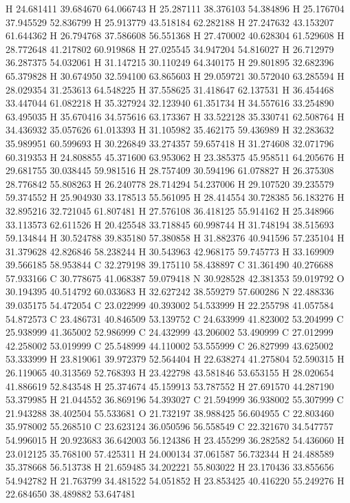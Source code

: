 \documentclass{article}
\begin{document}
H 24.681411 39.684670 64.066743
H 25.287111 38.376103 54.384896
H 25.176704 37.945529 52.836799
H 25.913779 43.518184 62.282188
H 27.247632 43.153207 61.644362
H 26.794768 37.586608 56.551368
H 27.470002 40.628304 61.529608
H 28.772648 41.217802 60.919868
H 27.025545 34.947204 54.816027
H 26.712979 36.287375 54.032061
H 31.147215 30.110249 64.340175
H 29.801895 32.682396 65.379828
H 30.674950 32.594100 63.865603
H 29.059721 30.572040 63.285594
H 28.029354 31.253613 64.548225
H 37.558625 31.418647 62.137531
H 36.454468 33.447044 61.082218
H 35.327924 32.123940 61.351734
H 34.557616 33.254890 63.495035
H 35.670416 34.575616 63.173367
H 33.522128 35.330741 62.508764
H 34.436932 35.057626 61.013393
H 31.105982 35.462175 59.436989
H 32.283632 35.989951 60.599693
H 30.226849 33.274357 59.657418
H 31.274608 32.071796 60.319353
H 24.808855 45.371600 63.953062
H 23.385375 45.958511 64.205676
H 29.681755 30.038445 59.981516
H 28.757409 30.594196 61.078827
H 26.375308 28.776842 55.808263
H 26.240778 28.714294 54.237006
H 29.107520 39.235579 59.374552
H 25.904930 33.178513 55.561095
H 28.414554 30.728385 56.183276
H 32.895216 32.721045 61.807481
H 27.576108 36.418125 55.914162
H 25.348966 33.113573 62.611526
H 20.425548 33.718845 60.998744
H 31.748194 38.515693 59.134844
H 30.524788 39.835180 57.380858
H 31.882376 40.941596 57.235104
H 31.379628 42.826846 58.238244
H 30.543963 42.968175 59.745773
H 33.169909 39.566185 58.953844
C 32.279198 39.175110 58.438897
C 31.361490 40.276688 57.933166
C 30.778675 41.068387 59.079418
N 30.928528 42.381353 59.019792
O 30.194395 40.514792 60.033683
H 32.627242 38.559279 57.600286
N 22.488336 39.035175 54.472054
C 23.022999 40.393002 54.533999
H 22.255798 41.057584 54.872573
C 23.486731 40.846509 53.139752
C 24.633999 41.823002 53.204999
C 25.938999 41.365002 52.986999
C 24.432999 43.206002 53.490999
C 27.012999 42.258002 53.019999
C 25.548999 44.110002 53.555999
C 26.827999 43.625002 53.333999
H 23.819061 39.972379 52.564404
H 22.638274 41.275804 52.590315
H 26.119065 40.313569 52.768393
H 23.422798 43.581846 53.653155
H 28.020654 41.886619 52.843548
H 25.374674 45.159913 53.787552
H 27.691570 44.287190 53.379985
H 21.044552 36.869196 54.393027
C 21.594999 36.938002 55.307999
C 21.943288 38.402504 55.533681
O 21.732197 38.988425 56.604955
C 22.803460 35.978002 55.268510
C 23.623124 36.050596 56.558549
C 22.321670 34.547757 54.996015
H 20.923683 36.642003 56.124386
H 23.455299 36.282582 54.436060
H 23.012125 35.768100 57.425311
H 24.000134 37.061587 56.732344
H 24.488589 35.378668 56.513738
H 21.659485 34.202221 55.803022
H 23.170436 33.855656 54.942782
H 21.763799 34.481522 54.051852
H 23.853425 40.416220 55.249276
H 22.684650 38.489882 53.647481
~    
   
\end{document}
